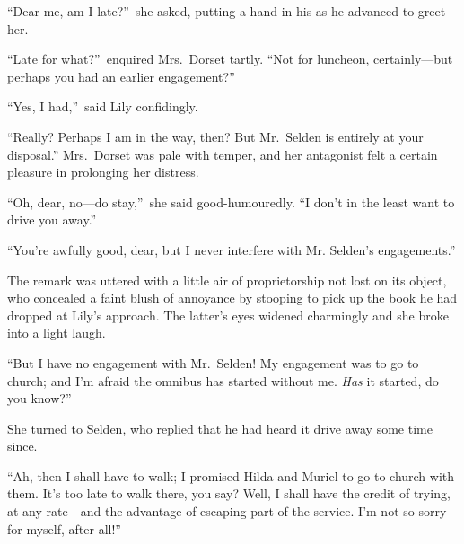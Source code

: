 \documentclass[12pt,a4paper]{book}
\begin{document}
``Dear me, am I late?''\ she asked, putting a hand in his as he
advanced to greet her.





``Late for what?''\ enquired Mrs.\ Dorset tartly. ``Not for luncheon,
certainly---but perhaps you had an earlier engagement?''





``Yes, I had,''\ said Lily confidingly.





``Really? Perhaps I am in the way, then? But Mr.\ Selden is
entirely at your disposal.'' Mrs.\ Dorset was pale with temper, and
her antagonist felt a certain pleasure in prolonging her
distress.





``Oh, dear, no---do stay,''\ she said good-humouredly. ``I don't in
the least want to drive you away.''





``You're awfully good, dear, but I never interfere with Mr.
Selden's engagements.''





The remark was uttered with a little air of proprietorship not
lost on its object, who concealed a faint blush of annoyance by
stooping to pick up the book he had dropped at Lily's approach. 
The latter's eyes widened charmingly and she broke into a light
laugh.





``But I have no engagement with Mr.\ Selden! My engagement was to
go to church; and I'm afraid the omnibus has started without me. 
\textit{Has} it started, do you know?''





She turned to Selden, who replied that he had heard it drive away
some time since.





``Ah, then I shall have to walk; I promised Hilda and Muriel to go
to church with them. It's too late to walk there, you say? Well,
I shall have the credit of trying, at any rate---and the advantage
of escaping part of the service. I'm not so sorry for myself,
after all!''
\end{document}
